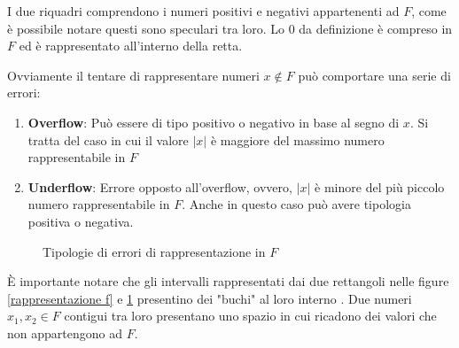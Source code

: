\documentclass[12pt, a4paper]{book}
\theoremstyle{definition}
\begin{document}
\begin{flushleft}
I due riquadri comprendono i numeri positivi e negativi appartenenti ad $F$, come è possibile notare questi sono speculari tra loro. Lo 0 da definizione è compreso in $F$ ed è rappresentato all'interno della retta.

Ovviamente il tentare di rappresentare numeri $x \notin F$ può comportare una serie di errori:
\begin{enumerate}
	\item \textbf{Overflow}: Può essere di tipo positivo o negativo in base al segno di $x$.  Si tratta del caso in cui il valore  $ |x| $ è maggiore del massimo numero rappresentabile in $F$
	\item \textbf{Underflow}: Errore opposto all'overflow, ovvero, $|x|$ è minore del più piccolo numero rappresentabile in $F$. Anche in questo caso può avere tipologia positiva o negativa.
\end{enumerate}

\begin{figure}[h!]
\centering
{}
\caption{Tipologie di errori di rappresentazione in $F$}
\label{rappresentazione errori f}
\end{figure}
 
È importante notare che gli intervalli rappresentati dai due rettangoli nelle figure \ref{rappresentazione f} e \ref{rappresentazione errori f} presentino dei "buchi" al loro interno . Due numeri $x_{1}, x_{2} \in F$  contigui tra loro presentano uno spazio in cui ricadono dei valori che non appartengono ad $F$.
 

\end{flushleft}
\end{document}
